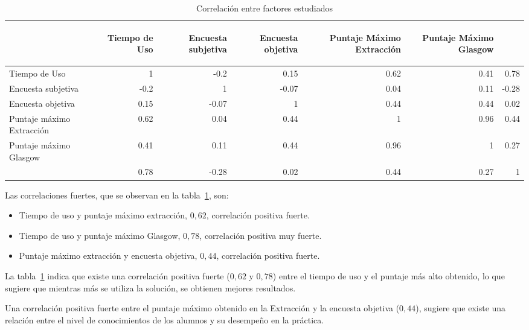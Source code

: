 \begin{table}[H]
\centering
\begin{tabular}{lrrrrrr}
\toprule
        &
\begin{sideways}\textbf{Tiempo de Uso}\end{sideways}             &
\begin{sideways}\textbf{Encuesta subjetiva}\end{sideways}        &
\begin{sideways}\textbf{Encuesta objetiva}\end{sideways}         &
\begin{sideways}\textbf{Puntaje Máximo Extracción}\end{sideways} &
\begin{sideways}\textbf{Puntaje Máximo Glasgow}\end{sideways}    \\
\midrule
Tiempo de Uso             & 1    & -0.2  & 0.15  & 0.62 & 0.41 & 0.78 \\
Encuesta subjetiva        & -0.2 & 1     & -0.07 & 0.04 & 0.11 & -0.28\\
Encuesta objetiva         & 0.15 & -0.07 & 1     & 0.44 & 0.44 & 0.02 \\
Puntaje máximo Extracción & 0.62 & 0.04  & 0.44  & 1    & 0.96 & 0.44 \\
Puntaje máximo Glasgow    & 0.41 & 0.11  & 0.44  & 0.96 & 1    & 0.27 \\
\bottomrule               & 0.78 & -0.28 & 0.02  & 0.44 & 0.27 & 1    \\
\end{tabular}
\caption{Correlación entre factores estudiados} 
\label{tab:all_correlation}
\end{table}

Las correlaciones fuertes, que se observan en la
tabla~\ref{tab:all_correlation}, son:

\begin{itemize}
    \item Tiempo de uso y puntaje máximo extracción, $0,62$, correlación
        positiva fuerte.
    \item Tiempo de uso y puntaje máximo Glasgow, $0,78$, correlación positiva
        muy fuerte.
    \item Puntaje máximo extracción y encuesta objetiva, $0,44$, correlación
        positiva fuerte.
\end{itemize}


La tabla~\ref{tab:all_correlation} indica que existe una correlación positiva
fuerte ($0,62$ y $0,78$) entre el tiempo de uso y el puntaje más alto obtenido,
lo que sugiere que mientras más se utiliza la solución, se obtienen mejores
resultados. 

Una correlación positiva fuerte entre el puntaje máximo obtenido en la
Extracción y la encuesta objetiva ($0,44$), sugiere que existe una relación entre
el nivel de conocimientos de los alumnos y su desempeño en la práctica.

